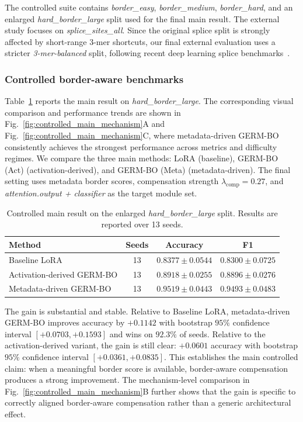\documentclass[12pt,letterpaper]{article}
\newcommand{\splitname}[1]{\textit{#1}}
\newcommand{\modpath}[1]{\textit{#1}}
\begin{document}
The controlled suite contains \splitname{border\_easy}, \splitname{border\_medium}, \splitname{border\_hard}, and an enlarged \splitname{hard\_border\_large} split used for the final main result. The external study focuses on \splitname{splice\_sites\_all}. Since the original splice split is strongly affected by short-range $3$-mer shortcuts, our final external evaluation uses a stricter \splitname{3-mer-balanced} split, following recent deep learning splice benchmarks~\cite{jaganathan2019spliceai,zhang2023pangolin}.

\subsubsection*{Controlled border-aware benchmarks}

Table~\ref{tab:controlled-main} reports the main result on \splitname{hard\_border\_large}. The corresponding visual comparison and performance trends are shown in Fig.~\ref{fig:controlled_main_mechanism}A and Fig.~\ref{fig:controlled_main_mechanism}C, where metadata-driven GERM-BO consistently achieves the strongest performance across metrics and difficulty regimes. We compare the three main methods: LoRA (baseline), GERM-BO (Act) (activation-derived), and GERM-BO (Meta) (metadata-driven). The final setting uses metadata border scores, compensation strength $\lambda_{\mathrm{comp}}=0.27$, and \modpath{attention.output + classifier} as the target module set.

\begin{table}[!htb]
\centering
\caption{Controlled main result on the enlarged \splitname{hard\_border\_large} split. Results are reported over 13 seeds.}
\label{tab:controlled-main}
\small
\begin{tabular}{lccc}
\toprule
Method & Seeds & Accuracy & F1 \\
\midrule
Baseline LoRA & 13 & $0.8377 \pm 0.0544$ & $0.8300 \pm 0.0725$ \\
Activation-derived GERM-BO & 13 & $0.8918 \pm 0.0255$ & $0.8896 \pm 0.0276$ \\
Metadata-driven GERM-BO & 13 & $\mathbf{0.9519 \pm 0.0443}$ & $\mathbf{0.9493 \pm 0.0483}$ \\
\bottomrule
\end{tabular}
\end{table}





The gain is substantial and stable. Relative to Baseline LoRA, metadata-driven GERM-BO improves accuracy by $+0.1142$ with bootstrap $95\%$ confidence interval $[+0.0703, +0.1593]$ and wins on $92.3\%$ of seeds. Relative to the activation-derived variant, the gain is still clear: $+0.0601$ accuracy with bootstrap $95\%$ confidence interval $[+0.0361, +0.0835]$. This establishes the main controlled claim: when a meaningful border score is available, border-aware compensation produces a strong improvement. The mechanism-level comparison in Fig.~\ref{fig:controlled_main_mechanism}B further shows that the gain is specific to correctly aligned border-aware compensation rather than a generic architectural effect.
\end{document}
